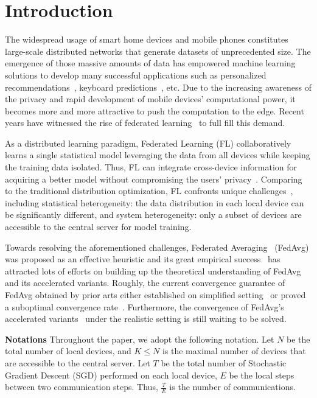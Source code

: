 

\section{Introduction}
The widespread usage of smart home devices and mobile phones constitutes
large-scale distributed networks that generate datasets of unprecedented size.
The emergence of those massive amounts of data has empowered machine learning
solutions to develop many successful applications such as personalized
recommendations~\cite{chen2018federated}, keyboard predictions~\cite{47586},
etc. Due to the increasing awareness of the privacy and rapid development of
mobile devices' computational power, it becomes more and more attractive to
push the computation to the edge. Recent years have witnessed the rise of
federated learning~\cite{mcmahan2016communication} to full fill this demand.

As a distributed learning paradigm, Federated Learning (FL) collaboratively
learns a single statistical model leveraging the data from all devices while
keeping the training data isolated.  Thus, FL can integrate cross-device
information for acquiring a better model  without compromising the users'
privacy~\cite{kairouz2019advances}. Comparing to the traditional distribution optimization,  FL confronts unique
challenges~\cite{li2019convergence,smith2017federated}, including statistical heterogeneity: the data distribution in each local device can be significantly different, and system heterogeneity: only a subset of devices are accessible to the central server for model training. 

Towards resolving the aforementioned challenges, Federated
Averaging~\cite{mcmahan2016communication} (FedAvg) was proposed as an
effective heuristic and its great empirical success~\cite{47586} has attracted
lots of efforts on building up the theoretical understanding of FedAvg
and its accelerated variants. 
Roughly, the current convergence guarantee of FedAvg obtained by prior arts either established on simplified setting~\cite{stich2018local,khaled2019first,wang2018cooperative,yu2019parallel} or proved a suboptimal 
convergence rate~\cite{li2019convergence}. Furthermore, the convergence of
FedAvg's accelerated variants~\cite{yu2019linear,huo2020faster,liu2019accelerating} under the realistic setting is still waiting to be solved.

\textbf{Notations}
Throughout the paper, we adopt the following notation. Let $N$ be the total
number of local devices, and $K \leq N$ is the maximal number of devices
that are accessible to the central server.  Let $T$ be the total number of  Stochastic Gradient Descent (SGD) performed on each local device, $E$ be the local steps between two communication steps. Thus, $\frac{T}{E}$ is
the number of communications.

